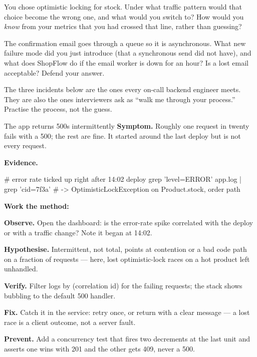 \begin{thinkbox}
You chose optimistic locking for stock. Under what traffic pattern would that choice become the wrong one, and what would you switch to? How would you \emph{know} from your metrics that you had crossed that line, rather than guessing?
\end{thinkbox}

\begin{thinkbox}
The confirmation email goes through a queue so it is asynchronous. What new failure mode did you just introduce (that a synchronous send did not have), and what does ShopFlow do if the email worker is down for an hour? Is a lost email acceptable? Defend your answer.
\end{thinkbox}


The three incidents below are the ones every on-call backend engineer meets. They are also the ones interviewers ask as ``walk me through your process.'' Practise the process, not the guess.

\begin{debuglab}{The app returns 500s intermittently}
\textbf{Symptom.} Roughly one request in twenty fails with a 500; the rest are fine. It started around the last deploy but is not every request.

\smallskip\textbf{Evidence.}
\begin{bashbox}
# error rate ticked up right after 14:02 deploy
grep 'level=ERROR' app.log | grep 'cid=7f3a'
# -> OptimisticLockException on Product.stock, order path
\end{bashbox}

\textbf{Work the method:}
\begin{tickcheck}
  \item \textbf{Observe.} Open the dashboard: is the error-rate spike correlated with the deploy or with a traffic change? Note it began at 14:02.
  \item \textbf{Hypothesise.} Intermittent, not total, points at contention or a bad code path on a fraction of requests --- here, lost optimistic-lock races on a hot product left unhandled.
  \item \textbf{Verify.} Filter logs by  (correlation id) for the failing requests; the stack shows  bubbling to the default 500 handler.
  \item \textbf{Fix.} Catch it in the service: retry once, or return  with a clear message --- a lost race is a client outcome, not a server fault.
  \item \textbf{Prevent.} Add a concurrency test that fires two decrements at the last unit and asserts one wins with 201 and the other gets 409, never a 500.
\end{tickcheck}
\end{debuglab}

